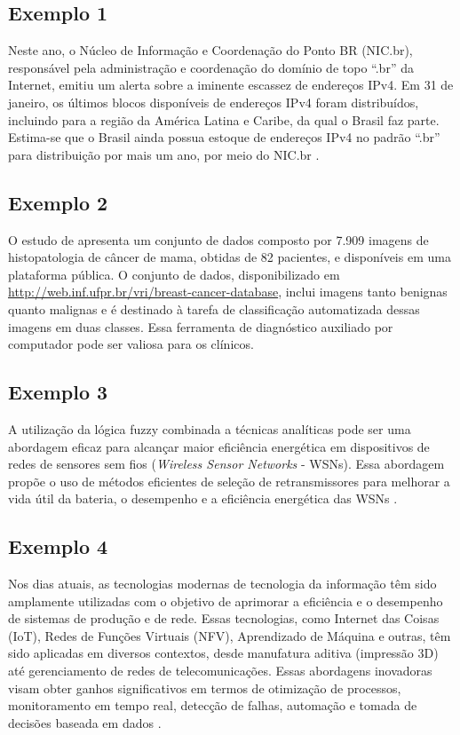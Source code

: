 \subsection{Exemplo 1}
Neste ano, o Núcleo de Informação e Coordenação do Ponto BR (NIC.br), responsável pela administração e coordenação do domínio de topo ``.br'' da Internet, emitiu um alerta sobre a iminente escassez de endereços IPv4. Em 31 de janeiro, os últimos blocos disponíveis de endereços IPv4 foram distribuídos, incluindo para a região da América Latina e Caribe, da qual o Brasil faz parte. Estima-se que o Brasil ainda possua estoque de endereços IPv4 no padrão ``.br'' para distribuição por mais um ano, por meio do NIC.br \citep{nicbr2023IANA}.

\subsection{Exemplo 2}
O estudo de \citet{spanhol2015dataset} apresenta um conjunto de dados composto por 7.909 imagens de histopatologia de câncer de mama, obtidas de 82 pacientes, e disponíveis em uma plataforma pública. O conjunto de dados, disponibilizado em \url{http://web.inf.ufpr.br/vri/breast-cancer-database}, inclui imagens tanto benignas quanto malignas e é destinado à tarefa de classificação automatizada dessas imagens em duas classes. Essa ferramenta de diagnóstico auxiliado por computador pode ser valiosa para os clínicos. 

\subsection{Exemplo 3}

A utilização da lógica fuzzy combinada a técnicas analíticas pode ser uma abordagem eficaz para alcançar maior eficiência energética em dispositivos de redes de sensores sem fios (\textit{Wireless Sensor Networks} - WSNs). Essa abordagem propõe o uso de métodos eficientes de seleção de retransmissores para melhorar a vida útil da bateria, o desempenho e a eficiência energética das WSNs \cite{engel2013relay}.

\subsection{Exemplo 4}

Nos dias atuais, as tecnologias modernas de tecnologia da informação têm sido amplamente utilizadas com o objetivo de aprimorar a eficiência e o desempenho de sistemas de produção e de rede. Essas tecnologias, como Internet das Coisas (IoT), Redes de Funções Virtuais (NFV), Aprendizado de Máquina e outras, têm sido aplicadas em diversos contextos, desde manufatura aditiva (impressão 3D) até gerenciamento de redes de telecomunicações. Essas abordagens inovadoras visam obter ganhos significativos em termos de otimização de processos, monitoramento em tempo real, detecção de falhas, automação e tomada de decisões baseada em dados \cite{huff2020building,scheffel2021automated}. 

